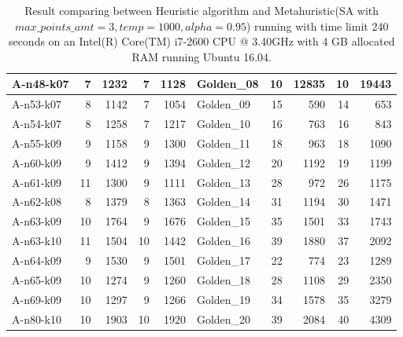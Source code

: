 \begin{table}[!h]
\begin{center}
\begin{tabular}{|l|r|r|r|r|l|r|r|r|r|}
    A-n48-k07 & 7 & 1232 & 7 & 1128 & Golden\_08 & 10 & 12835 & 10 & 19443 \\ \hline
    A-n53-k07 & 8 & 1142 & 7 & 1054 & Golden\_09 & 15 & 590 & 14 & 653 \\ \hline
    A-n54-k07 & 8 & 1258 & 7 & 1217 & Golden\_10 & 16 & 763 & 16 & 843 \\ \hline
    A-n55-k09 & 9 & 1158 & 9 & 1300 & Golden\_11 & 18 & 963 & 18 & 1090 \\ \hline
    A-n60-k09 & 9 & 1412 & 9 & 1394 & Golden\_12 & 20 & 1192 & 19 & 1199 \\ \hline
    A-n61-k09 & 11 & 1300 & 9 & 1111 & Golden\_13 & 28 & 972 & 26 & 1175 \\ \hline
    A-n62-k08 & 8 & 1379 & 8 & 1363 & Golden\_14 & 31 & 1194 & 30 & 1471 \\ \hline
    A-n63-k09 & 10 & 1764 & 9 & 1676 & Golden\_15 & 35 & 1501 & 33 & 1743 \\ \hline
    A-n63-k10 & 11 & 1504 & 10 & 1442 & Golden\_16 & 39 & 1880 & 37 & 2092 \\ \hline
    A-n64-k09 & 9 & 1530 & 9 & 1501 & Golden\_17 & 22 & 774 & 23 & 1289 \\ \hline
    A-n65-k09 & 10 & 1274 & 9 & 1260 & Golden\_18 & 28 & 1108 & 29 & 2350 \\ \hline
    A-n69-k09 & 10 & 1297 & 9 & 1266 & Golden\_19 & 34 & 1578 & 35 & 3279 \\ \hline
    A-n80-k10 & 10 & 1903 & 10 & 1920 & Golden\_20 & 39 & 2084 & 40 & 4309 \\ \hline
    \end{tabular}
    \end{center}
    \caption{Result comparing between Heuristic algorithm and Metahuristic(SA with $max\_points\_amt = 3, temp = 1000, alpha=0.95$) running with time limit 240 seconds on an Intel(R) Core(TM) i7-2600 CPU @ 3.40GHz with 4 GB allocated RAM running Ubuntu 16.04.}
    \label{table:cost}
    \end{table}
    